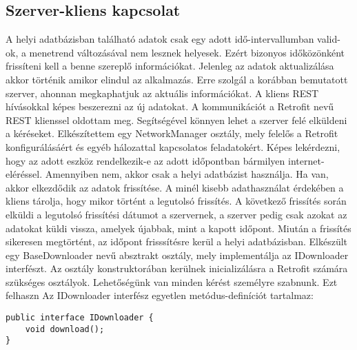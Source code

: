 \subsection*{Szerver-kliens kapcsolat}
\label{serverclient}
A helyi adatbázisban található adatok csak egy adott idő-intervallumban valid-ok, a menetrend változásával nem lesznek helyesek. Ezért bizonyos időközönként frissíteni kell a benne szereplő információkat. Jelenleg az adatok aktualizálása akkor történik amikor elindul az alkalmazás.
Erre szolgál a korábban bemutatott szerver, ahonnan megkaphatjuk az aktuális információkat.
A kliens REST hívásokkal képes beszerezni az új adatokat. 
A kommunikációt a Retrofit nevű REST klienssel oldottam meg. Segítségével könnyen lehet a szerver felé elküldeni a kéréseket. 
Elkészítettem egy NetworkManager osztály, mely felelős a Retrofit konfigurálásáért és egyéb hálozattal kapcsolatos feladatokért.
Képes lekérdezni, hogy az adott eszköz rendelkezik-e az adott időpontban bármilyen internet-eléréssel. Amennyiben nem, akkor csak a helyi adatbázist használja. Ha van, akkor elkezdődik az adatok frissítése.
A minél kisebb adathasználat érdekében a kliens tárolja, hogy mikor történt a legutolsó frissítés. A következő frissítés során elküldi a legutolsó frissítési dátumot a szervernek, a szerver pedig csak azokat az adatokat küldi vissza, amelyek újabbak, mint a kapott időpont.
Miután a frissítés sikeresen megtörtént, az időpont frisssítésre kerül a helyi adatbázisban.
Elkészült egy BaseDownloader nevű absztrakt osztály, mely implementálja az IDownloader interfészt.
Az osztály konstruktorában kerülnek inicializálásra a Retrofit számára szükséges osztályok.
Lehetőségünk van minden kérést személyre szabnunk. Ezt felhaszn
Az IDownloader interfész egyetlen metódus-definíciót tartalmaz:
\begin{lstlisting}
public interface IDownloader {
    void download();
}
\end{lstlisting}













\newpage